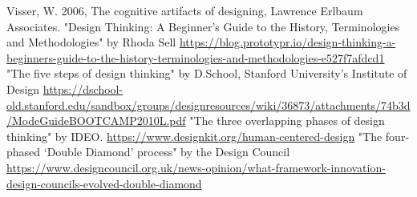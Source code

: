 \documentclass[a4paper,titleauthor]{mwart}
\begin{document}
\begin{thebibliography}{SYCYfProjekt}
 Visser, W. 2006, The cognitive artifacts of designing, Lawrence Erlbaum Associates.
"Design Thinking: A Beginner’s Guide to the History, Terminologies and Methodologies" by Rhoda Sell \url{https://blog.prototypr.io/design-thinking-a-beginners-guide-to-the-history-terminologies-and-methodologies-e527f7afdcd1}
"The five steps of design thinking" by D.School, Stanford University’s Institute of Design \url{https://dschool-old.stanford.edu/sandbox/groups/designresources/wiki/36873/attachments/74b3d/ModeGuideBOOTCAMP2010L.pdf}
"The three overlapping phases of design thinking" by IDEO. \url{https://www.designkit.org/human-centered-design}
"The four-phased ‘Double Diamond’ process" by the Design Council \url{https://www.designcouncil.org.uk/news-opinion/what-framework-innovation-design-councils-evolved-double-diamond}
\end{thebibliography}
\end{document}
